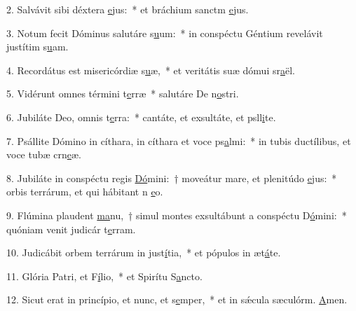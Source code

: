 2. Salvávit sibi déxtera \uline{e}jus:~* et bráchium sanctm \uline{e}jus.\par 
3. Notum fecit Dóminus salutáre s\uline{u}um:~* in conspéctu Géntium revelávit justítim s\uline{u}am.\par 
4. Recordátus est misericórdiæ s\uline{u}æ,~* et veritátis suæ dómui sr\uline{a}ël.\par 
5. Vidérunt omnes términi t\uline{e}rræ~* salutáre De n\uline{o}stri.\par 
6. Jubiláte Deo, omnis t\uline{e}rra:~* cantáte, et exsultáte, et psll\uline{i}te.\par 
7. Psállite Dómino in cíthara, in cíthara et voce ps\uline{a}lmi:~* in tubis ductílibus, et voce tubæ crn\uline{e}æ.\par 
8. Jubiláte in conspéctu regis \uline{Dó}mini:~† moveátur mare, et plenitúdo \uline{e}jus:~* orbis terrárum, et qui hábitant n \uline{e}o.\par 
9. Flúmina plaudent \uline{ma}nu,~† simul montes exsultábunt a conspéctu D\uline{ó}mini:~* quóniam venit judicár t\uline{e}rram.\par 
10. Judicábit orbem terrárum in just\uline{í}tia,~* et pópulos in æt\uline{á}te.\par 
11. Glória Patri, et F\uline{í}lio,~* et Spirítu S\uline{a}ncto.\par 
12. Sicut erat in princípio, et nunc, et s\uline{e}mper,~* et in sǽcula sæculórm. \uline{A}men.\par 
